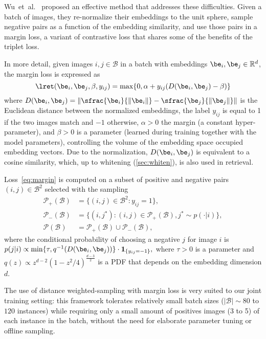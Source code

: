Wu~et~al.~\cite{wu2017sampling} proposed an effective method that addresses these difficulties.
Given a batch of images, they re-normalize their embeddings to the unit sphere, sample negative pairs as a function of the embedding similarity, and use those pairs in a margin loss, a variant of contrastive loss that shares some of the benefits of the triplet loss.

In more detail, given images $i,j\in\mathcal{B}$ in a batch with embeddings $\be_i,\be_j\in\mathbb{R}^d$, the margin loss is expressed as
\begin{equation}\label{eq:margin}
  \lret(\be_i, \be_j, \beta, y_{ij})
  = \max\{0, \alpha + y_{ij}(D(\be_i, \be_j) - \beta)\}
\end{equation}
where
$
%
    D(\be_i, \be_j) = \left\| \sfrac{\be_i}{\|\be_i\|} - \sfrac{\be_j}{\|\be_j\|}\right\|
$
%
is the Euclidean distance between the normalized embeddings, the label $y_{ij}$ is equal to 1 if the two images match and $-1$ otherwise, $\alpha > 0$ the margin (a constant hyper-parameter), and $\beta > 0$ is a parameter (learned during training together with the model parameters), controlling the volume of the embedding space occupied embedding vectors.
Due to the normalization, $D(\be_i, \be_j)$ is equivalent to a cosine similarity, which, up to whitening (\cref{sec:whiten}), is also used in retrieval.

%
%
%
%
%
%
%

Loss~\eqref{eq:margin} is computed on a subset of positive and negative pairs $(i,j)\in \mathcal{B}^2$ selected with the sampling~\cite{wu2017sampling} 
%
%
\begin{equation}
\begin{aligned}
\mathcal{P}_+(\mathcal{B})
&= \{ (i,j) \in \mathcal{B}^2: y_{ij} = 1\},
\\
\mathcal{P}_-(\mathcal{B})
&=
  \{ (i,j^*) : (i,j) \in \mathcal{P}_+(\mathcal{B}), 
  j^* \sim p(\cdot|i)
  \},
\\
\mathcal{P}(\mathcal{B})&=\mathcal{P}_+(\mathcal{B})\cup\mathcal{P}_-(\mathcal{B}),
\end{aligned}
\end{equation}
where the conditional probability of choosing a negative $j$ for image $i$ is 
$
 p(j|i) \propto \min\{\tau, q^{-1}(D(\be_i,\be_j))\} 
 \cdot \mathbf{1}_{\{y_{ij}=-1\}},
$
where $\tau > 0$ is a parameter and $q(z) \propto z^{d-2}(1 - z^2/4)^{\frac{d-3}{2}}$ is a PDF that depends on the embedding dimension $d$.

The use of distance weighted-sampling with margin loss is very suited to our joint training setting: this framework tolerates relatively small batch sizes ($|\mathcal{B}|\sim 80$ to $120$ instances) while requiring only a small amount of positives images (3 to 5) of each instance in the batch, without the need for elaborate parameter tuning or offline sampling.

